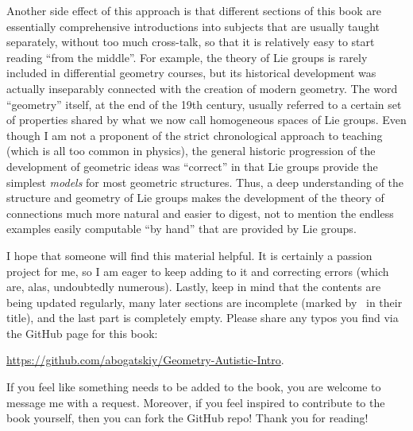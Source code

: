 Another side effect of this approach is that different sections of this book are essentially comprehensive introductions into subjects that are usually taught separately, without too much cross-talk, so that it is relatively easy to start reading ``from the middle''. For example, the theory of Lie groups is rarely included in differential geometry courses, but its historical development was actually inseparably connected with the creation of modern geometry. The word ``geometry'' itself, at the end of the 19th century, usually referred to a certain set of properties shared by what we now call homogeneous spaces of Lie groups. Even though I am not a proponent of the strict chronological approach to teaching (which is all too common in physics), the general historic progression of the development of geometric ideas was ``correct'' in that Lie groups provide the simplest \emph{models} for most geometric structures. Thus, a deep understanding of the structure and geometry of Lie groups makes the development of the theory of connections much more natural and easier to digest, not to mention the endless examples easily computable ``by hand'' that are provided by Lie groups.

I hope that someone will find this material helpful. It is certainly a passion project for me, so I am eager to keep adding to it and correcting errors (which are, alas, undoubtedly numerous). Lastly, keep in mind that the contents are being updated regularly, many later sections are incomplete (marked by \ucmark\ in their title), and the last part is completely empty. Please share any typos you find via the GitHub page for this book:
\begin{center}
    \url{https://github.com/abogatskiy/Geometry-Autistic-Intro}.
\end{center}
If you feel like something needs to be added to the book, you are welcome to message me with a request. Moreover, if you feel inspired to contribute to the book yourself, then you can fork the GitHub repo! Thank you for reading!